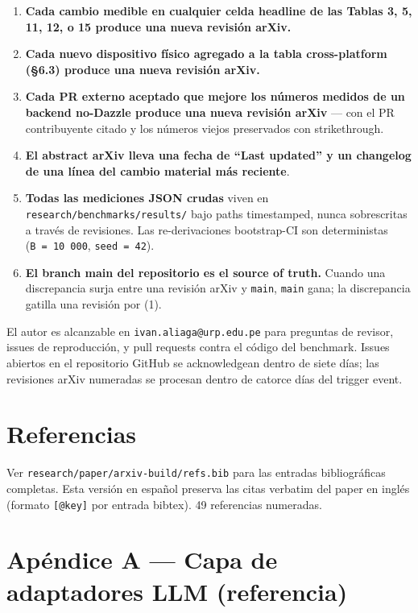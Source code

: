 \begin{enumerate}
\def\labelenumi{\arabic{enumi}.}
\tightlist
\item
  \textbf{Cada cambio medible en cualquier celda headline de las Tablas 3, 5,
  11, 12, o 15 produce una nueva revisión arXiv.}
\item
  \textbf{Cada nuevo dispositivo físico agregado a la tabla cross-platform
  (§6.3) produce una nueva revisión arXiv.}
\item
  \textbf{Cada PR externo aceptado que mejore los números medidos de un backend
  no-Dazzle produce una nueva revisión arXiv} --- con el PR contribuyente citado
  y los números viejos preservados con strikethrough.
\item
  \textbf{El abstract arXiv lleva una fecha de ``Last updated'' y un changelog
  de una línea del cambio material más reciente}.
\item
  \textbf{Todas las mediciones JSON crudas} viven en
  \texttt{research/benchmarks/results/} bajo paths timestamped, nunca
  sobrescritas a través de revisiones. Las re-derivaciones bootstrap-CI son
  deterministas (\texttt{B\ =\ 10\ 000}, \texttt{seed\ =\ 42}).
\item
  \textbf{El branch main del repositorio es el source of truth.} Cuando una
  discrepancia surja entre una revisión arXiv y \texttt{main}, \texttt{main}
  gana; la discrepancia gatilla una revisión por (1).
\end{enumerate}

El autor es alcanzable en \texttt{ivan.aliaga@urp.edu.pe} para preguntas de
revisor, issues de reproducción, y pull requests contra el código del benchmark.
Issues abiertos en el repositorio GitHub se acknowledgean dentro de siete días;
las revisiones arXiv numeradas se procesan dentro de catorce días del trigger
event.

\section{Referencias}\label{referencias}

Ver \texttt{research/paper/arxiv-build/refs.bib} para las entradas
bibliográficas completas. Esta versión en español preserva las citas verbatim
del paper en inglés (formato \texttt{{[}@key{]}} por entrada bibtex). 49
referencias numeradas.

\section{Apéndice A --- Capa de adaptadores LLM
(referencia)}\label{apuxe9ndice-a-capa-de-adaptadores-llm-referencia}

